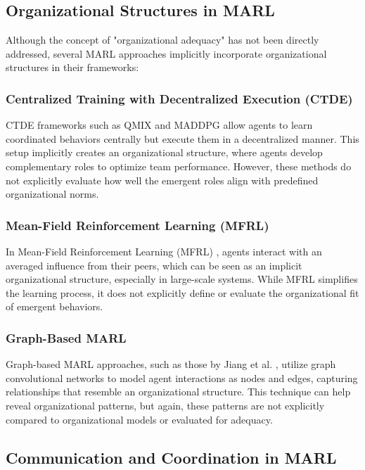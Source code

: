 \documentclass[sigconf,anonymous]{aamas}
\begin{document}
\subsection{Organizational Structures in MARL}

Although the concept of "organizational adequacy" has not been directly addressed, several MARL approaches implicitly incorporate organizational structures in their frameworks:

\subsubsection{Centralized Training with Decentralized Execution (CTDE)}
CTDE frameworks such as QMIX \cite{rashid2018qmix} and MADDPG \cite{lowe2017multi} allow agents to learn coordinated behaviors centrally but execute them in a decentralized manner. This setup implicitly creates an organizational structure, where agents develop complementary roles to optimize team performance. However, these methods do not explicitly evaluate how well the emergent roles align with predefined organizational norms.

\subsubsection{Mean-Field Reinforcement Learning (MFRL)}
In Mean-Field Reinforcement Learning (MFRL) \cite{yang2018mean}, agents interact with an averaged influence from their peers, which can be seen as an implicit organizational structure, especially in large-scale systems. While MFRL simplifies the learning process, it does not explicitly define or evaluate the organizational fit of emergent behaviors.

\subsubsection{Graph-Based MARL}
Graph-based MARL approaches, such as those by Jiang et al. \cite{jiang2018graph}, utilize graph convolutional networks to model agent interactions as nodes and edges, capturing relationships that resemble an organizational structure. This technique can help reveal organizational patterns, but again, these patterns are not explicitly compared to organizational models or evaluated for adequacy.

\subsection{Communication and Coordination in MARL}
\end{document}
